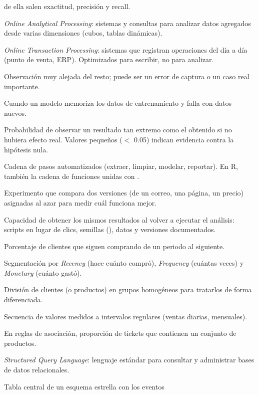 \begin{description}[style=nextline, leftmargin=1.2em, itemsep=0.35em]
  de ella salen exactitud, precisión y recall.
\item[OLAP] \emph{Online Analytical Processing}: sistemas y consultas para
  analizar datos agregados desde varias dimensiones (cubos, tablas
  dinámicas).
\item[OLTP] \emph{Online Transaction Processing}: sistemas que registran
  operaciones del día a día (punto de venta, ERP). Optimizados para
  escribir, no para analizar.
\item[Outlier (valor atípico)] Observación muy alejada del resto; puede ser
  un error de captura o un caso real importante.
\item[Overfitting (sobreajuste)] Cuando un modelo memoriza los datos de
  entrenamiento y falla con datos nuevos.
\item[p-valor] Probabilidad de observar un resultado tan extremo como el
  obtenido si no hubiera efecto real. Valores pequeños ($<$ 0.05) indican
  evidencia contra la hipótesis nula.
\item[Pipeline] Cadena de pasos automatizados (extraer, limpiar, modelar,
  reportar). En R, también la cadena de funciones unidas con
  \codigo{\%>\%}.
\item[Prueba A/B] Experimento que compara dos versiones (de un correo, una
  página, un precio) asignadas al azar para medir cuál funciona mejor.
\item[Reproducibilidad] Capacidad de obtener los mismos resultados al
  volver a ejecutar el análisis: scripts en lugar de clics, semillas
  (), datos y versiones documentados.
\item[Retención] Porcentaje de clientes que siguen comprando de un periodo
  al siguiente.
\item[RFM] Segmentación por \emph{Recency} (hace cuánto compró),
  \emph{Frequency} (cuántas veces) y \emph{Monetary} (cuánto gastó).
\item[Segmentación] División de clientes (o productos) en grupos
  homogéneos para tratarlos de forma diferenciada.
\item[Serie de tiempo] Secuencia de valores medidos a intervalos regulares
  (ventas diarias, mensuales).
\item[Soporte] En reglas de asociación, proporción de tickets que contienen
  un conjunto de productos.
\item[SQL] \emph{Structured Query Language}: lenguaje estándar para
  consultar y administrar bases de datos relacionales.
\item[Tabla de hechos] Tabla central de un esquema estrella con los eventos

\end{description}
